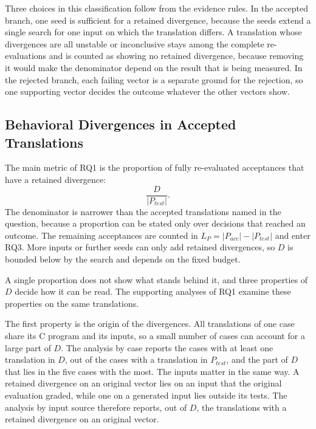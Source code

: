 Three choices in this classification follow from the evidence rules. In the accepted branch, one seed is sufficient for a retained divergence, because the seeds extend a single search for one input on which the translation differs. A translation whose divergences are all unstable or inconclusive stays among the complete re-evaluations and is counted as showing no retained divergence, because removing it would make the denominator depend on the result that is being measured. In the rejected branch, each failing vector is a separate ground for the rejection, so one supporting vector decides the outcome whatever the other vectors show.

\subsection{Behavioral Divergences in Accepted Translations}\label{sec:m-rq1}

The main metric of RQ1 is the proportion of fully re-evaluated acceptances that have a retained divergence:
\begin{equation}
\frac{D}{|P_{\mathit{test}}|}.
\end{equation}
The denominator is narrower than the accepted translations named in the question, because a proportion can be stated only over decisions that reached an outcome. The remaining acceptances are counted in $L_P = |P_{\mathit{acc}}| - |P_{\mathit{test}}|$ and enter RQ3. More inputs or further seeds can only add retained divergences, so $D$ is bounded below by the search and depends on the fixed budget.

A single proportion does not show what stands behind it, and three properties of $D$ decide how it can be read. The supporting analyses of RQ1 examine these properties on the same translations.

The first property is the origin of the divergences. All translations of one case share its C program and its inputs, so a small number of cases can account for a large part of $D$. The analysis by case reports the cases with at least one translation in $D$, out of the cases with a translation in $P_{\mathit{test}}$, and the part of $D$ that lies in the five cases with the most. The inputs matter in the same way. A retained divergence on an original vector lies on an input that the original evaluation graded, while one on a generated input lies outside its tests. The analysis by input source therefore reports, out of $D$, the translations with a retained divergence on an original vector.

